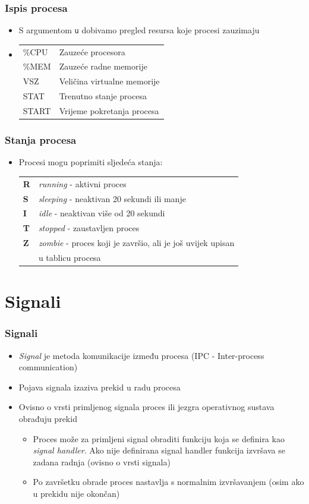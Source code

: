 \documentclass[table,usenames,dvipsnames]{beamer}
\newcommand{\shell}[1]{\texttt{#1}}
\begin{document}
\begin{frame}[t]
	\frametitle{Ispis procesa}
	\begin{itemize}
		\item S argumentom \shell{u} dobivamo pregled resursa koje procesi zauzimaju
		\item[]
		\begin{tabular}{l l}
			\%CPU   & Zauzeće procesora  \\
			\%MEM   & Zauzeće radne memorije \\ 
			VSZ     & Veličina virtualne memorije \\
			STAT    & Trenutno stanje procesa \\
			START   & Vrijeme pokretanja procesa
		\end{tabular}
	\end{itemize}
\end{frame}

\begin{frame}[t]
	\frametitle{Stanja procesa}
	\begin{itemize}
		\item Procesi mogu poprimiti sljedeća stanja:
		\begin{tabular}{l l}
			\\
			\textbf{R}  & \emph{running} - aktivni proces \\
			\textbf{S}  & \emph{sleeping} - neaktivan 20 sekundi ili manje \\
			\textbf{I}  & \emph{idle} - neaktivan više od 20 sekundi \\
			\textbf{T}  & \emph{stopped} - zaustavljen proces \\
			\textbf{Z}  & \emph{zombie} - proces koji je završio, ali je još uvijek upisan \\ & u tablicu procesa
		\end{tabular}
	\end{itemize}
\end{frame}

\section{Signali}
\begin{frame}[t]
	\frametitle{Signali}
	\begin{itemize}
		\item \emph{Signal} je metoda komunikacije između procesa (IPC - Inter-process communication)
		\item Pojava signala izaziva prekid u radu procesa
		\item Ovisno o vrsti primljenog signala proces ili jezgra operativnog sustava obrađuju prekid
		\begin{itemize}
			\item Proces može za primljeni signal obraditi funkciju koja se definira kao \emph{signal handler}. Ako nije definirana signal handler funkcija izvršava se zadana radnja (ovisno o vrsti signala)			\item Po završetku obrade proces nastavlja s normalnim izvršavanjem (osim ako u prekidu nije okončan)
		\end{itemize}
	\end{itemize}
\end{frame}
\end{document}
